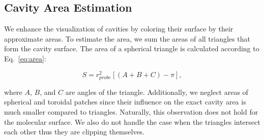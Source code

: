 \subsection{Cavity Area Estimation}\label{sec:area}
We enhance the visualization of cavities by coloring their surface by their approximate areas.
To estimate the area, we sum the areas of all triangles that form the cavity surface.
The area of a spherical triangle is calculated according to Eq.~\ref{eq:area}:

\begin{equation}
  S = r_{probe}^2 \left[ \left( A + B + C \right) - \pi \right],
	\label{eq:area}
\end{equation}

where $A$, $B$, and $C$ are angles of the triangle. 
Additionally, we neglect areas of spherical and toroidal patches since their influence on the exact cavity area is much smaller compared to triangles.
Naturally, this observation does not hold for the molecular surface.
We also do not handle the case when the triangles intersect each other thus they are clipping themselves.
